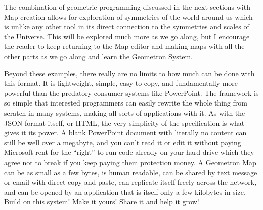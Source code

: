 The combination of geometric programming discussed in the next sections with Map creation allows for exploration of symmetries of the world around us which is unlike any other tool in its direct connection to the symmetries and scales of the Universe.  This will be explored much more as we go along, but I encourage the reader to keep returning to the Map editor and making maps with all the other parts as we go along and learn the Geometron System.
 
Beyond these examples, there really are no limits to how much can be done with this format.  It is lightweight, simple, easy to copy, and fundamentally more powerful than the predatory consumer systems like PowerPoint.  The framework is so simple that interested programmers can easily rewrite the whole thing from scratch in many systems, making all sorts of applications with it.  As with the JSON format itself, or HTML, the very simplicity of the specification is what gives it its power.  A blank PowerPoint document with literally no content can still be well over a megabyte, and you can't read it or edit it without paying Microsoft rent for the ``right'' to run code already on your hard drive which they agree not to break if you keep paying them protection money.  A Geometron Map can be as small as a few bytes, is human readable, can be shared by text message or email with direct copy and paste, can replicate itself freely across the network, and can be opened by an application that is itself only a few kilobytes in size.  Build on this system! Make it yours! Share it and help it grow!




